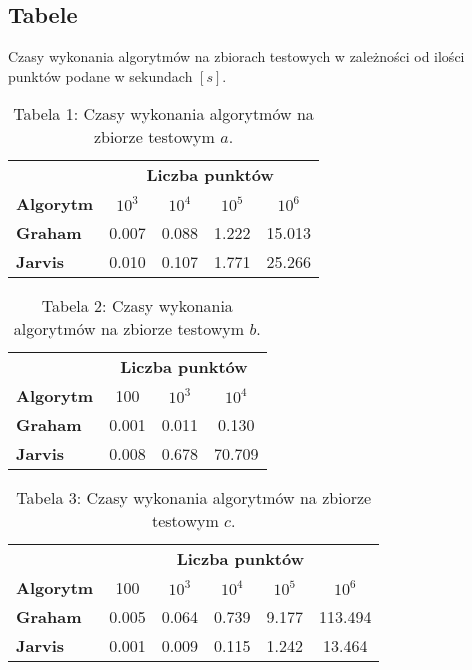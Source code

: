 \subsection{Tabele}
\quad Czasy wykonania algorytmów na zbiorach testowych w zależności od ilości punktów podane w sekundach $[s]$.
\renewcommand{\arraystretch}{2}
\begin{table}[!ht]
    \centering
\begin{tabular}{l  c|c|c|c|}
    & \multicolumn{4}{c}{\textbf{Liczba punktów}} \\ \cline{2-5}     
    \multicolumn{1}{l|}{\textbf{Algorytm}} & $10^3$& $10^4$& $10^5$& $10^6$ \\
   \hline
   \hline
   \multicolumn{1}{l|}{\textbf{Graham}} & 0.007& 0.088& 1.222& 15.013 \\
   \hline
   \multicolumn{1}{l|}{\textbf{Jarvis}} & 0.010& 0.107& 1.771& 25.266 \\
   \cline{2-5}
\end{tabular}
\caption*{Tabela 1: Czasy wykonania algorytmów na zbiorze testowym $a$.}
\end{table}


\begin{table}[!ht]
    \centering
\begin{tabular}{l  c|c|c|}
    & \multicolumn{3}{c}{\textbf{Liczba punktów}} \\ \cline{2-4}     
    \multicolumn{1}{l|}{\textbf{Algorytm}} & 100& $10^3$& $10^4$ \\
   \hline
   \hline
   \multicolumn{1}{l|}{\textbf{Graham}} & 0.001& 0.011& 0.130 \\
   \hline
   \multicolumn{1}{l|}{\textbf{Jarvis}} & 0.008& 0.678& 70.709 \\
   \cline{2-4}
\end{tabular}
\caption*{Tabela 2: Czasy wykonania algorytmów na zbiorze testowym $b$.}
\end{table}


\begin{table}[!ht]
    \centering
\begin{tabular}{l  c|c|c|c|c|}
    & \multicolumn{5}{c}{\textbf{Liczba punktów}} \\ \cline{2-6}     
    \multicolumn{1}{l|}{\textbf{Algorytm}} & 100& $10^3$& $10^4$& $10^5$& $10^6$ \\
   \hline
   \hline
   \multicolumn{1}{l|}{\textbf{Graham}} & 0.005& 0.064& 0.739& 9.177& 113.494 \\
   \hline
   \multicolumn{1}{l|}{\textbf{Jarvis}} & 0.001& 0.009& 0.115& 1.242& 13.464 \\
   \cline{2-6}
\end{tabular}
\caption*{Tabela 3: Czasy wykonania algorytmów na zbiorze testowym $c$.}
\end{table}


